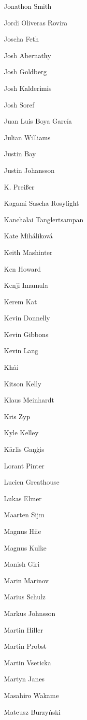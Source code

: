 \begin{DoxyItemize}
\item Jonathon Smith
\item Jordi Oliveras Rovira
\item Joscha Feth
\item Josh Abernathy
\item Josh Goldberg
\item Josh Kalderimis
\item Josh Soref
\item Juan Luis Boya García
\item Julian Williams
\item Justin Bay
\item Justin Johansson
\item K. Preißer
\item Kagami Sascha Rosylight
\item Kanchalai Tanglertsampan
\item Kate Miháliková
\item Keith Mashinter
\item Ken Howard
\item Kenji Imamula
\item Kerem Kat
\item Kevin Donnelly
\item Kevin Gibbons
\item Kevin Lang
\item Khải
\item Kitson Kelly
\item Klaus Meinhardt
\item Kris Zyp
\item Kyle Kelley
\item Kārlis Gaņģis
\item Lorant Pinter
\item Lucien Greathouse
\item Lukas Elmer
\item Maarten Sijm
\item Magnus Hiie
\item Magnus Kulke
\item Manish Giri
\item Marin Marinov
\item Marius Schulz
\item Markus Johnsson
\item Martin Hiller
\item Martin Probst
\item Martin Vseticka
\item Martyn Janes
\item Masahiro Wakame
\item Mateusz Burzyński

\end{DoxyItemize}
